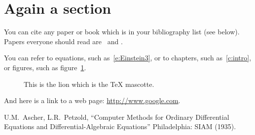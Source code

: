 \documentclass[11pt]{report}
\begin{document}
  \section{Again a section}

    You can cite any paper or book which is in your bibliography list
    (see below). Papers everyone should read are~\cite{Einstein:1935rr}
    and \cite{Feynman:1948ur}.

    You can refer to equations, such as~\eqref{e:Einstein3}, or to
    chapters, such as~\ref{c:intro}, or figures, such as figure~\ref{f:lion}.

    \begin{figure}[h]
    \begin{center}

    \end{center}
    \caption{This is the lion which is the \TeX{} mascotte.\label{f:lion}}
    \end{figure}


    And here is a link to a web page: \url{http://www.google.com}.






\begin{thebibliography}{50}
    U.M.~Ascher, L.R.~Petzold,
    ``Computer Methods for Ordinary Differential Equations and Differential-Algebraic Equations''
    Philadelphia: SIAM  (1935).


\end{thebibliography}
\end{document}
